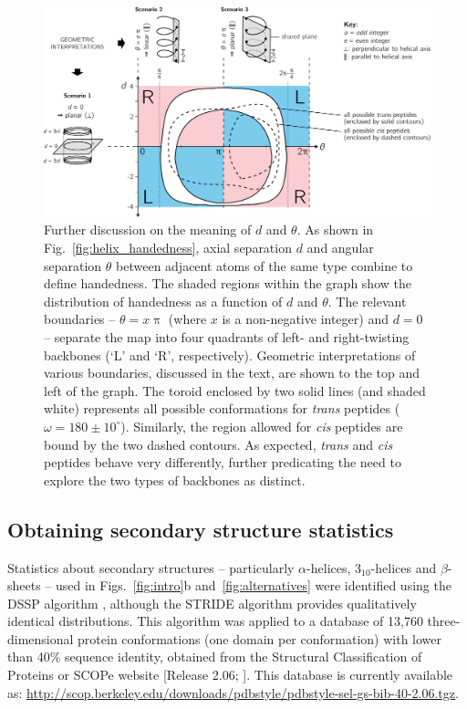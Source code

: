 \documentclass[fleqn,10pt,lineno]{wlpeerj} %
\newcommand{\n}[1]{{\color{black}#1}} %
\newcommand{\Fig}[1]{Fig.~\ref{#1}}
\newcommand{\Figs}[1]{Figs.~\ref{#1}}
\newcommand{\cis}{{\em cis}\xspace}
\newcommand{\trans}{{\em trans}\xspace}
\begin{document}
\begin{figure}[t!]
\centering
\includegraphics[width=0.85\linewidth]{./figures/dtheta_full3.pdf}
\caption{\label{fig:d_vs_theta} \n{Further discussion on the meaning of $d$ and $\theta$. As shown in \Fig{fig:helix_handedness}, axial separation $d$ and angular separation $\theta$ between adjacent atoms of the same type combine to define handedness. The shaded regions within the graph show the distribution of handedness as a function of $d$ and $\theta$. The relevant boundaries -- $\theta=x\uppi$ (where $x$ is a non-negative integer) and $d=0$ -- separate the map into four quadrants of left- and right-twisting backbones (`L' and `R', respectively). Geometric interpretations of various boundaries, discussed in the text, are shown to the top and left of the graph. The toroid enclosed by two solid lines (and shaded white) represents all possible conformations for \trans peptides ($\omega=180 \pm 10^\circ$). Similarly, the region allowed for \cis peptides are bound by the two dashed contours. As expected, \trans and \cis peptides behave very differently, further predicating the need to explore the two types of backbones as distinct.
} 
}
\end{figure}

\n{
\subsection*{Obtaining secondary structure statistics}
Statistics about secondary structures -- particularly $\alpha$-helices, $3_{10}$-helices and $\beta$-sheets -- used in \Figs{fig:intro}b and~\ref{fig:alternatives} were identified using the DSSP algorithm \citep{Kabsch1983}, although the STRIDE algorithm \citep{Frishman1995} provides qualitatively identical distributions. This algorithm was applied to a database of 13,760 three-dimensional protein conformations (one domain per conformation) with lower than 40\% sequence identity, obtained from the Structural Classification of Proteins or SCOPe website [Release 2.06; \cite{Fox2014}]. This database is currently available as: \url{http://scop.berkeley.edu/downloads/pdbstyle/pdbstyle-sel-gs-bib-40-2.06.tgz}.}
\end{document}

